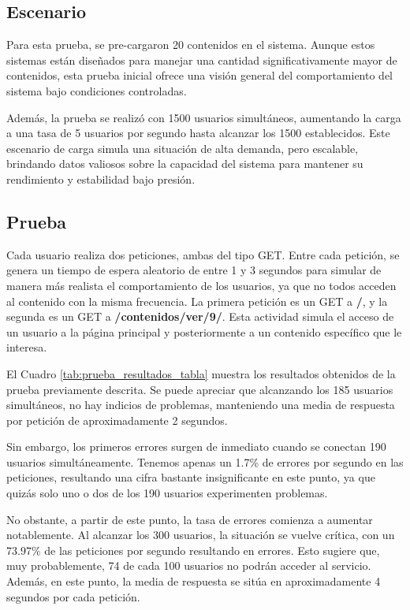 \documentclass[10pt,times,twocolumn]{article}
\begin{document}
\subsection{Escenario}

Para esta prueba, se pre-cargaron 20 contenidos en el sistema. Aunque estos sistemas están diseñados para manejar una cantidad significativamente mayor de contenidos, esta prueba inicial ofrece una visión general del comportamiento del sistema bajo condiciones controladas.

Además, la prueba se realizó con 1500 usuarios simultáneos, aumentando la carga a una tasa de 5 usuarios por segundo hasta alcanzar los 1500 establecidos. Este escenario de carga simula una situación de alta demanda, pero escalable, brindando datos valiosos sobre la capacidad del sistema para mantener su rendimiento y estabilidad bajo presión.

\subsection{Prueba}

Cada usuario realiza dos peticiones, ambas del tipo GET. Entre cada petición, se genera un tiempo de espera aleatorio de entre 1 y 3 segundos para simular de manera más realista el comportamiento de los usuarios, ya que no todos acceden al contenido con la misma frecuencia. La primera petición es un GET a \textbf{/}, y la segunda es un GET a \textbf{/contenidos/ver/9/}. Esta actividad simula el acceso de un usuario a la página principal y posteriormente a un contenido específico que le interesa.


El Cuadro \ref{tab:prueba_resultados_tabla} muestra los resultados obtenidos de la prueba previamente descrita. Se puede apreciar que alcanzando los 185 usuarios simultáneos, no hay indicios de problemas, manteniendo una media de respuesta por petición de aproximadamente 2 segundos. 

Sin embargo, los primeros errores surgen de inmediato cuando se conectan 190 usuarios simultáneamente. Tenemos apenas un 1.7\% de errores por segundo en las peticiones, resultando una cifra bastante insignificante en este punto, ya que quizás solo uno o dos de los 190 usuarios experimenten problemas. 

No obstante, a partir de este punto, la tasa de errores comienza a aumentar notablemente. Al alcanzar los 300 usuarios, la situación se vuelve crítica, con un 73.97\% de las peticiones por segundo resultando en errores. Esto sugiere que, muy probablemente, 74 de cada 100 usuarios no podrán acceder al servicio. Además, en este punto, la media de respuesta se sitúa en aproximadamente 4 segundos por cada petición.
\end{document}
